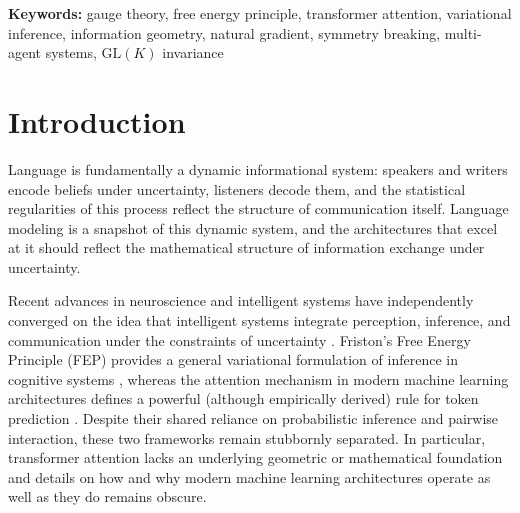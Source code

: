 \documentclass[twoside,11pt]{article}
\begin{document}
\begin{abstract}
We validate the unreduced theory by training a $\mathrm{GL}(K)$ gauge transformer on WikiText-103 using only KL divergences, gauge transport, and natural gradient dynamics (without learned attention projections, MLPs, or pointwise activation functions such as ReLU or GELU). The model achieves test perplexity 90.6, surpassing a matched Kneser-Ney 5-gram baseline (PPL 134.8) by $1.49\times$, with emergent semantic structure in the learned gauge frames. We separately validate the degenerate-limit predictions on frozen BERT across 105 diverse passages, confirming quantitative agreement between KL-based and dot-product attention (grand mean $r = 0.804$ at the predicted optimal temperature, 95\% CI $[0.771, 0.838]$, with cross-passage SE $< 0.02$ for all 144 heads). Both architectures operate in the flat bundle limit with trivially vanishing holonomy: a geometric regime we conjecture is matched to the approximately path-independent semantic transport that language requires.
\end{abstract}

\noindent\textbf{Keywords:} gauge theory, free energy principle, transformer attention, variational inference, information geometry, natural gradient, symmetry breaking, multi-agent systems, $\mathrm{GL}(K)$ invariance

\section{Introduction}

Language is fundamentally a dynamic informational system: speakers and writers encode beliefs under uncertainty, listeners decode them, and the statistical regularities of this process reflect the structure of communication itself. Language modeling is a snapshot of this dynamic system, and the architectures that excel at it should reflect the mathematical structure of information exchange under uncertainty.

Recent advances in neuroscience and intelligent systems have independently converged on the idea that intelligent systems integrate perception, inference, and communication under the constraints of uncertainty \citep{bahdanau2014neural,amari1998natural,bronstein2021geometric,foerster2016learning,wooldridge2009introduction}. Friston's Free Energy Principle (FEP) provides a general variational formulation of inference in cognitive systems \citep{friston2010free,parr2022active,friston2017graphical,ramstead2020variational}, whereas the attention mechanism in modern machine learning architectures defines a powerful (although empirically derived) rule for token prediction \citep{clark2019does,vaswani2017attention}. Despite their shared reliance on probabilistic inference and pairwise interaction, these two frameworks remain stubbornly separated. In particular, transformer attention lacks an underlying geometric or mathematical foundation and details on how and why modern machine learning architectures operate as well as they do remains obscure.
\end{document}
